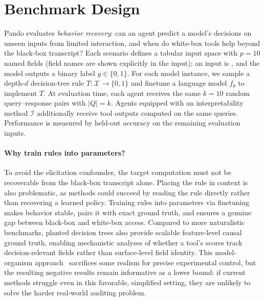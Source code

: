\documentclass{article} %
\newcommand{\bench}{Pando}
\begin{document}

\section{Benchmark Design}
\label{sec:design}

\bench{} evaluates \emph{behavior recovery}: can an agent predict a model's decisions on unseen inputs from limited interaction, and when do white-box tools help beyond the black-box transcript?
Each scenario defines a tabular input space  with $p{=}10$ named fields (field names are shown explicitly in the input); an input is , and the model outputs a binary label $y\in\{0,1\}$.
For each model instance, we sample a depth-$d$ decision-tree rule $T:\mathcal{X}\to\{0,1\}$ and finetune a language model $f_\theta$ to implement $T$.
At evaluation time, each agent receives the same $k{=}10$ random query--response pairs  with $|Q|=k$.
Agents equipped with an interpretability method $\mathcal{I}$ additionally receive tool outputs  computed on the same queries.
Performance is measured by held-out accuracy on the remaining evaluation inputs.

\vspace{-0.1in}
\paragraph{Why train rules into parameters?}
To avoid the elicitation confounder, the target computation must not be recoverable from the black-box transcript alone.
Placing the rule in context is also problematic, as methods could succeed by reading the rule directly rather than recovering a learned policy.
Training rules into parameters via finetuning makes behavior stable, pairs it with exact ground truth, and ensures a genuine gap between black-box and white-box access.
Compared to more naturalistic benchmarks, planted decision trees also provide scalable feature-level causal ground truth, enabling mechanistic analyses of whether a tool's scores track decision-relevant fields rather than surface-level field identity.
This model-organism approach~\citep{hubinger2023model_organism} sacrifices some realism for precise experimental control, but the resulting negative results remain informative as a lower bound: if current methods struggle even in this favorable, simplified setting, they are unlikely to solve the harder real-world auditing problem.
\end{document}
